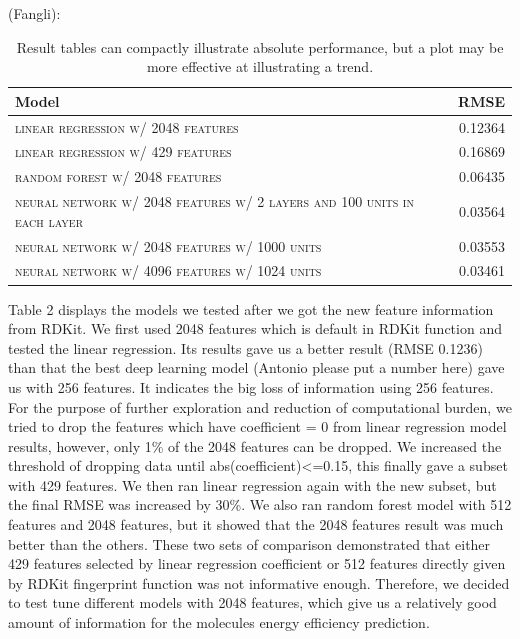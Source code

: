 \documentclass[11pt]{article}
\begin{document}
(Fangli):
\begin{table}
\centering
\begin{tabular}{llr}
 \toprule
 Model &  & RMSE \\
 \midrule
 \textsc{linear regression w/ 2048 features} & & 0.12364\\
 \textsc{linear regression w/ 429 features} & & 0.16869 \\
 \textsc{random forest w/ 2048 features} & & 0.06435 \\
 \textsc{neural network w/ 2048 features w/ 2 layers and 100 units in each layer} & & 0.03564  \\
 \textsc{neural network w/ 2048 features w/ 1000 units} & &0.03553 \\
 \textsc{neural network w/ 4096 features w/ 1024 units} & & 0.03461\\
 \bottomrule
\end{tabular}
\caption{\label{tab:results} Result tables can compactly illustrate absolute performance, but a plot may be more effective at illustrating a trend.}
\end{table}
Table 2 displays the models we tested after we got the new feature information from RDKit. We first used 2048 features which is default in RDKit function and tested the linear regression. Its results gave us a better result (RMSE 0.1236) than that the best deep learning model (Antonio please put a number here) gave us with 256 features. It indicates the big loss of information using 256 features. \\

For the purpose of further exploration and reduction of computational burden, we tried to drop the features which have coefficient = 0 from linear regression model results, however, only 1\% of the 2048 features can be dropped. We increased the threshold of dropping data until abs(coefficient)<=0.15, this finally gave a subset with 429 features. We then ran linear regression again with the new subset, but the final RMSE was increased by 30\%. We also ran random forest model with 512 features and 2048 features, but it showed that the 2048 features result was much better than the others. These two sets of comparison demonstrated that either 429 features selected by linear regression coefficient or 512 features directly given by RDKit fingerprint function was not informative enough. Therefore, we decided to test tune different models with 2048 features, which give us a relatively good amount of information for the molecules energy efficiency prediction. \\
\end{document}
